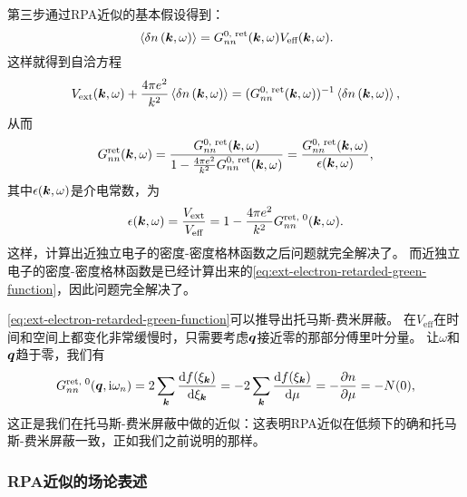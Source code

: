 第三步通过RPA近似的基本假设得到：
\begin{equation}
    \expval*{\var{{n}}(\vb*{k}, \omega)} = G^\text{0, ret}_{nn} (\vb*{k}, \omega) V_\text{eff} (\vb*{k}, \omega).
    \label{eq:rpa-approximation}
\end{equation}
这样就得到自洽方程
\[
    V_\text{ext}(\vb*{k}, \omega) + \frac{4\pi e^2}{k^2} \expval*{\var{{n}}(\vb*{k}, \omega)} = (G^\text{0, ret}_{nn} (\vb*{k}, \omega))^{-1} \expval*{\var{{n}}(\vb*{k}, \omega)},
\]
从而
\begin{equation}
    G^\text{ret}_{nn}(\vb*{k}, \omega) = \frac{G^\text{0, ret}_{nn}(\vb*{k}, \omega)}{1 - \frac{4\pi e^2}{k^2} G^\text{0, ret}_{nn}(\vb*{k}, \omega)} = \frac{G^\text{0, ret}_{nn}(\vb*{k}, \omega)}{\epsilon(\vb*{k}, \omega)},
    \label{eq:ext-electron-ret-nn}
\end{equation}
其中$\epsilon(\vb*{k}, \omega)$是介电常数，为
\begin{equation}
    \epsilon(\vb*{k}, \omega) = \frac{V_\text{ext}}{V_\text{eff}} = 1 - \frac{4 \pi e^2}{k^2} G^\text{ret, 0}_{nn}(\vb*{k}, \omega).
\end{equation}
这样，计算出近独立电子的密度-密度格林函数之后问题就完全解决了。
而近独立电子的密度-密度格林函数是已经计算出来的\eqref{eq:ext-electron-retarded-green-function}，因此问题完全解决了。

\eqref{eq:ext-electron-retarded-green-function}可以推导出托马斯-费米屏蔽。
在$V_\text{eff}$在时间和空间上都变化非常缓慢时，只需要考虑$\vb*{q}$接近零的那部分傅里叶分量。
让$\omega$和$\vb*{q}$趋于零，我们有
\[
    G_{nn}^\text{ret, 0}(\vb*{q}, \mathrm{i} \omega_n) = 2 \sum_{\vb*{k}} \dv{f(\xi_{\vb*{k}})}{\xi_{\vb*{k}}} = - 2 \sum_{\vb*{k}} \dv{f(\xi_{\vb*{k}})}{\mu} = - \pdv{n}{\mu} = - N(0),
\]
这正是我们在托马斯-费米屏蔽中做的近似：这表明RPA近似在低频下的确和托马斯-费米屏蔽一致，正如我们之前说明的那样。

\subsubsection{RPA近似的场论表述}\label{sec:rpa-field-theory}

